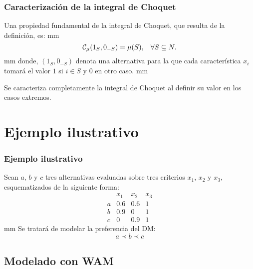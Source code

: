 \documentclass{beamer}
\theoremstyle{definition}
\begin{document}
  \begin{frame}
    \frametitle{Caracterización de la integral de Choquet}
    Una propiedad fundamental de la integral de Choquet, que resulta
    de la definición, es:  mm
    $$
    \mathcal C_\mu (1_S, 0_{-S})=\mu (S), \hspace {3 mm} \forall S
    \subseteq N.
    $$
     mm 
    donde, $(1_S, 0_{-S})$ denota una alternativa para la
    que cada característica $x_i$ tomará el valor $1$ si $i \in S$ y
    $0$ en otro caso.
     mm
    \begin{center}
    \alert{Se caracteriza completamente la integral de Choquet
    al definir su valor en los casos extremos.}
   \end{center}
\end{frame}

  \section{Ejemplo ilustrativo}

  \begin{frame}
    \frametitle{Ejemplo ilustrativo}
    Sean $a$, $b$ y $c$ tres alternativas evaluadas sobre tres
    criterios $x_1$, $x_2$ y $x_3$, esquematizados de la siguiente
    forma:
    $$
      \begin{array}{rccc}
        &  x_1 & x_2 & x_3 \\
        a & 0.6 & 0.6 & 1\\
        b & 0.9 & 0 & 1\\
        c & 0 & 0.9 & 1
      \end{array}
     $$
      mm Se tratará de modelar la preferencia del DM:
     $$
     a \prec b \prec c
     $$
   \end{frame}

   \subsection{Modelado con WAM}
\end{document}
